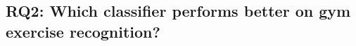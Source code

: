 \documentclass[journal,article,submit,moreauthors,pdftex]{Definitions/mdpi}
\newcommand{\hosein}[1]{\textcolor{orange}{{\it [Hosein: #1]}}}
\begin{document}

\subsection{RQ2: Which classifier performs better on gym exercise recognition?}
\end{document}
